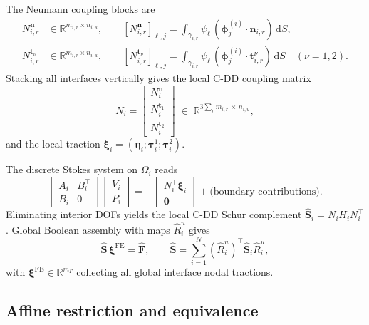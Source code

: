 \documentclass[11pt,a4paper]{article}
\newcommand{\R}{\mathbb{R}}
\newcommand{\pore}[1]{\Omega_{#1}}
\newcommand{\iface}{\gamma}
\newcommand{\normal}{\bm{n}}
\newcommand{\Schur}{\mathbf{S}}
\begin{document}
The Neumann coupling blocks are
\begin{align*}
  N_{i,r}^{\normal} &\in \R^{m_{i,r} \times n_{i,u}},\qquad
  [N_{i,r}^{\normal}]_{\ell,j}
  = \int_{\iface_{i,r}} \psi_\ell\,(\bm{\phi}_j^{(i)}
    \cdot \normal_{i,r})\,\mathrm{d}S,\\
  N_{i,r}^{\bm{t}_\nu} &\in \R^{m_{i,r} \times n_{i,u}},\qquad
  [N_{i,r}^{\bm{t}_\nu}]_{\ell,j}
  = \int_{\iface_{i,r}} \psi_\ell\,(\bm{\phi}_j^{(i)}
    \cdot \bm{t}_{i,r}^\nu)\,\mathrm{d}S \quad (\nu = 1,2).
\end{align*}
Stacking all interfaces vertically gives the local C-DD coupling matrix
\begin{equation}\label{eq:N-stack}
  N_i =
  \begin{bmatrix}
    N_i^{\normal} \\ N_i^{\bm{t}_1} \\ N_i^{\bm{t}_2}
  \end{bmatrix}
  \;\in\; \R^{3\sum_r m_{i,r}\,\times\, n_{i,u}},
\end{equation}
and the local traction $\bm{\xi}_i
= (\bm{\eta}_i; \bm{\tau}_i^1; \bm{\tau}_i^2)$.

The discrete Stokes system on $\pore{i}$ reads
\[
  \begin{bmatrix} A_i & B_i^\top \\ B_i & 0 \end{bmatrix}
  \begin{bmatrix} V_i \\ P_i \end{bmatrix}
  = -\begin{bmatrix} N_i^\top \bm{\xi}_i \\ \bm{0} \end{bmatrix}
    + \text{(boundary contributions)}.
\]
Eliminating interior DOFs yields the local C-DD Schur complement
$\widehat{\Schur}_i = N_i H_i N_i^\top$.
Global Boolean assembly with maps $\widehat{R}_i^u$ gives
\begin{equation}\label{eq:cdd-global}
  \widehat{\Schur}\,\bm{\xi}^{\text{FE}} = \widehat{\bm{F}},\qquad
  \widehat{\Schur} = \sum_{i=1}^N (\widehat{R}_i^u)^\top
    \widehat{\Schur}_i \widehat{R}_i^u,
\end{equation}
with $\bm{\xi}^{\text{FE}} \in \R^{m_\Gamma}$ collecting all global
interface nodal tractions.

\subsection{Affine restriction and equivalence}
\end{document}
